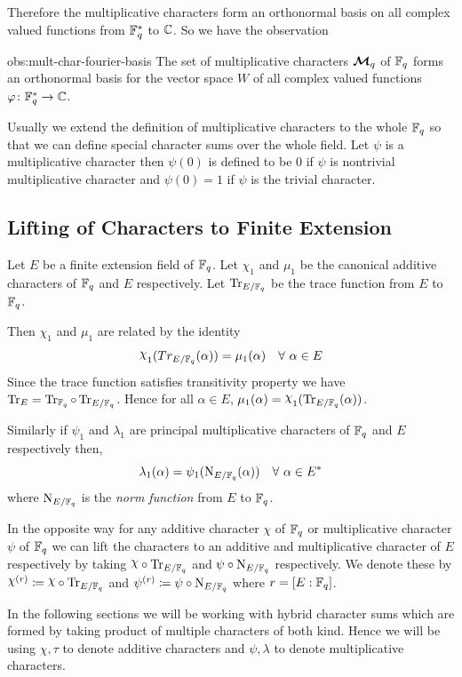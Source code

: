 Therefore the multiplicative characters form an orthonormal basis on all complex valued functions from $\mathbb{F}_q^*$ to $\mathbb{C}$. So we have the observation
\begin{observation}{obs:mult-char-fourier-basis}
  The set of multiplicative characters $\boldsymbol{\mathcal{M}}_q$ of $\mathbb{F}_q$ forms an orthonormal basis for the vector space $W$ of all complex valued functions $\varphi\colon\mathbb{F}_q^*\to\mathbb{C}$.  
\end{observation}
Usually we extend the definition of multiplicative characters to the whole $\mathbb{F}_q$ so that we can define special character sums over the whole field. Let $\psi$ is a multiplicative character then $\psi(0)$ is defined to be $0$ if $\psi$ is nontrivial multiplicative character and $\psi(0)=1$ if $\psi$ is the trivial character.
\subsection{Lifting of Characters to Finite Extension}\label{sec:lifting-chars}%
%
Let $E$ be a finite extension field of $\mathbb{F}_q$. Let $\chi_1$ and $\mu_1$ be the canonical additive characters of $\mathbb{F}_q$ and $E$ respectively. Let $\operatorname{Tr}_{E/\mathbb{F}_q}$ be the trace function from $E$ to $\mathbb{F}_q$.

Then $\chi_1$ and $\mu_1$ are related by the identity $$\chi_1(Tr_{E/\bbF_q}(\alpha))=\mu_1(\alpha) \quad \forall\ \alpha\in E$$Since the trace function satisfies transitivity property we have $\operatorname{Tr}_E=\operatorname{Tr}_{\mathbb{F}_q}\circ\operatorname{Tr}_{E/\mathbb{F}_q}$. Hence for all $\alpha\in E$, $\mu_1(\alpha)=\chi_1(\tr_{E/\bbF_q}(\alpha))$.

Similarly if $\psi_1$ and $\lambda_1$ are principal multiplicative characters of $\mathbb{F}_q$ and $E$ respectively then, $$\lambda_1(\alpha)=\psi_1(\operatorname{N}_{E/\mathbb{F}_q}(\alpha))\quad \forall\ \alpha\in E^*$$ where $\operatorname{N}_{E/\mathbb{F}_q}$ is the \emph{norm function} from $E$ to $\mathbb{F}_q$.

In the opposite way for any additive character $\chi$ of $\mathbb{F}_q$ or multiplicative character $\psi$ of $\mathbb{F}_q$ we can lift the characters to an additive and multiplicative character of $E$ respectively by taking $\chi\circ\tr_{E/\bbF_q}$ and $\psi\circ\operatorname{N}_{E/\mathbb{F}_q}$ respectively. We denote these by $\chi^{(r)}\coloneqq \chi\circ\tr_{E/\bbF_q}$ and $\psi^{(r)}\coloneqq \psi\circ\operatorname{N}_{E/\mathbb{F}_q}$ where $r=[E:\mathbb{F}_q]$.

In the following sections we will be working with hybrid character sums which are formed by taking product of multiple characters of both kind. Hence we will be using $\chi,\tau$ to denote additive characters and $\psi, \lambda$ to denote multiplicative characters.